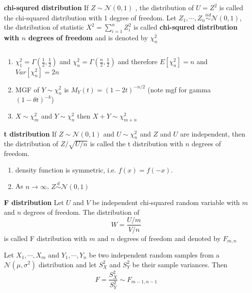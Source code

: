 \documentclass[11pt]{article}
\begin{document}
\begin{defn*}
  \textbf{chi-squred distribution}
  If $Z \sim \mathcal{N}(0,1)$ , the distribution of $U = Z^2$ is called the chi-squared distribution with 1 degree of freedom. Let $Z_1, \cdots, Z_n \stackrel{iid}{\sim} \mathcal{N}(0,1)$, the distribution of statistic $X^2 = \sum_{i=1}^n Z_i^2$ is called \textbf{chi-squred distribution with $n$ degrees of freedom} and is denoted by $\chi_n^2$
  \begin{rem}
    $ $
    \begin{enumerate}
      \item $\chi_1^2 = \Gamma(\frac{1}{2}, \frac{1}{2})$ and $\chi_n^2 = \Gamma(\frac{n}{2}, \frac{1}{2})$ and therefore $E[\chi_n^2] = n$ and $Var[\chi_n^2] = 2n$
      \item MGF of $Y\sim \chi_n^2$ is $M_Y(t) = (1-2t)^{-n / 2 }$ (note mgf for gamma $(1-\theta t)^{-k}$)
      \item $X\sim \chi_m^2$ and $Y\sim \chi_n^2$ then $X+Y\sim \chi^2_{m+n}$
    \end{enumerate}
  \end{rem}
\end{defn*}


\begin{defn*}
  \textbf{t distribution}
  If $Z\sim \mathcal{N}(0,1)$ and $U\sim \chi_n^2$ and $Z$ and $U$ are independent, then the distribution of $Z / \sqrt{U / n}$ is called the t distribution with $n$ degrees of freedom.
  \begin{rem}
    \begin{enumerate}
      \item density function is symmetric, i.e. $f(x) = f(-x)$.
      \item As $n\to\infty$, $Z \stackrel{d}{\sim} \mathcal{N}(0,1)$
    \end{enumerate}
  \end{rem}
\end{defn*}


\begin{defn*}
  \textbf{F distribution}
  Let $U$ and $V$ be independent chi-squared random variable with $m$ and $n$ degrees of freedom. The distribution of
  \[
    W = \frac{U / m}{V / n}
  \]
  is called F distribution with $m$ and $n$ degrees of freedom and denoted by $F_{m,n}$
  \begin{rem}
    Let $X_1, \cdots, X_m$ and $Y_1, \cdots, Y_n$ be two independent random samples from a $\mathcal{N}(\mu, \sigma^2)$ distribution and let $S_X^2$ and $S_Y^2$ be their sample variances. Then
    \[
      F = \frac{S_X^2}{S_Y^2} \sim F_{m-1, n-1}
    \]
  \end{rem}
\end{defn*}
\end{document}
